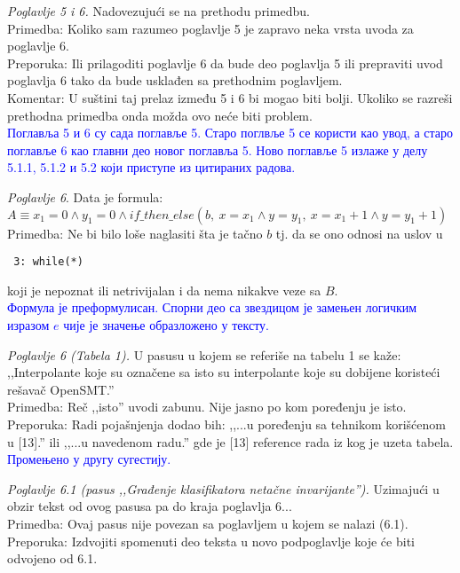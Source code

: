 \documentclass[a4paper]{report}
\newcommand{\odgovor}[1]{\textcolor{blue}{#1}}
\begin{document}
\textit{Poglavlje 5 i 6.} Nadovezujući se na prethodu primedbu. \\
\indent Primedba: Koliko sam razumeo poglavlje 5 je zapravo neka vrsta uvoda za poglavlje 6. \\
\indent Preporuka: Ili prilagoditi poglavlje 6 da bude deo poglavlja 5 ili prepraviti uvod poglavlja 6 tako da bude usklađen sa prethodnim poglavljem. \\
\indent Komentar: U suštini taj prelaz između 5 i 6 bi mogao biti bolji. Ukoliko se razreši prethodna primedba onda možda ovo neće biti problem. \\

\odgovor{Поглавља 5 и 6 су сада поглавље 5. Старо поглвље 5 се користи као увод, а старо поглавље 6 као главни део новог поглавља 5.
    Ново поглавље 5 излаже у делу 5.1.1, 5.1.2 и 5.2 који  приступе из цитираних радова.}

\textit{Poglavlje 6}. Data je formula: \\ 
$A \equiv x_1 = 0 \land y_1 = 0 \land if\_then\_else(b,\ x = x_1 \land y = y_1,\ x = x_1 + 1 \land y = y_1 + 1)$ \\
\indent Primedba: Ne bi bilo loše naglasiti šta je tačno $b$ tj. da se ono odnosi na uslov u \begin{verbatim} 3: while(*) \end{verbatim} koji je nepoznat ili netrivijalan i da nema nikakve veze sa $B$. \\

\odgovor{Формула је преформулисан. Спорни део са звездицом је замењен логичким изразом $e$ чије је значење образложено у тексту.}

\textit{Poglavlje 6 (Tabela 1).} U pasusu u kojem se referiše na tabelu 1 se kaže: ,,Interpolante koje su označene sa isto su interpolante koje su dobijene koristeći rešavač OpenSMT.'' \\
\indent Primedba: Reč ,,isto'' uvodi zabunu. Nije jasno po kom poređenju je isto. \\
\indent Preporuka: Radi pojašnjenja dodao bih: ,,...u poređenju sa tehnikom korišćenom u [13].'' ili ,,...u navedenom radu.'' gde je [13] reference rada iz kog je uzeta tabela. \\

\odgovor{Промењено у другу сугестију.}

\textit{Poglavlje 6.1 (pasus ,,Građenje klasifikatora netačne invarijante'').} Uzimajući u obzir tekst od ovog pasusa pa do kraja poglavlja 6... \\
\indent Primedba: Ovaj pasus nije povezan sa poglavljem u kojem se nalazi (6.1). \\
\indent Preporuka: Izdvojiti spomenuti deo teksta u novo podpoglavlje koje će biti odvojeno od 6.1. \\
\end{document}
